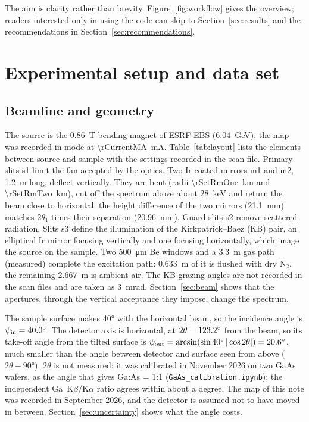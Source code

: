 \documentclass[11pt,a4paper]{article}
\newcommand{\code}[1]{\texttt{#1}}
\begin{document}
The aim is clarity rather than brevity. Figure~\ref{fig:workflow} gives the overview; readers interested only in using the code can skip to
Section~\ref{sec:results} and the recommendations in
Section~\ref{sec:recommendations}.

\section{Experimental setup and data set}\label{sec:setup}
\subsection{Beamline and geometry}\label{sec:layout}
The source is the \qty{0.86}{T} bending magnet of ESRF-EBS (\qty{6.04}{GeV}); the map was recorded in
\rFillMode{} mode at \qty{\rCurrentMA}{mA}. Table~\ref{tab:layout} lists the elements between source
and sample with the settings recorded in the scan file. Primary slits s1 limit the fan accepted by
the optics. Two Ir-coated mirrors m1 and m2, \qty{1.2}{m} long, deflect vertically. They are bent
(radii \qty{\rSetRmOne}{km} and \qty{\rSetRmTwo}{km}), cut off the spectrum above about \qty{28}{keV}
and return the beam close to horizontal: the height difference of the two mirrors
(\qty{21.1}{mm}) matches $2\theta_1$ times their separation (\qty{20.96}{mm}). Guard slits s2 remove
scattered radiation. Slits s3 define the illumination of the Kirkpatrick--Baez (KB) pair, an
elliptical Ir mirror focusing vertically and one focusing horizontally, which image the source on the
sample. Two \qty{500}{\micro\metre} Be windows and a \qty{3.3}{m} gas path (measured) complete the
excitation path: \qty{0.633}{m} of it is flushed with dry N$_2$, the remaining \qty{2.667}{m} is
ambient air. The KB grazing angles are not recorded in the scan files and are taken as
\qty{3}{mrad}. Section~\ref{sec:beam} shows that the apertures, through the vertical acceptance they
impose, change the spectrum.

The sample surface makes \ang{40} with the horizontal beam, so the incidence angle is
$\psi_\mathrm{in}=\ang{40.0}$. The detector axis is horizontal, at $2\theta=\ang{123.2}$ from
the beam, so its take-off angle from the tilted surface is
$\psi_\mathrm{out}=\arcsin(\sin\ang{40}\,|\cos2\theta|)=\ang{20.6}$, much smaller than the angle
between detector and surface seen from above ($2\theta-\ang{90}$). $2\theta$ is not measured: it was
calibrated in November 2026 on two GaAs wafers, as the angle that gives Ga:As = 1:1
(\code{GaAs\_calibration.ipynb}); the independent Ga~K$\beta$/K$\alpha$ ratio agrees within about a degree.
The map of this note was recorded in September 2026, and the detector is assumed not to have moved in
between. Section~\ref{sec:uncertainty} shows what the angle costs.
\end{document}
